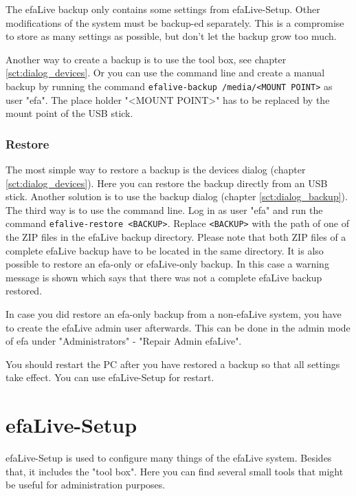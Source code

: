 \documentclass[a4paper,12pt,twoside]{article}
\begin{document}
The efaLive backup only contains some settings from efaLive-Setup. Other
modifications of the system must be backup-ed separately. This is a
compromise to store as many settings as possible, but
don't let the backup grow too much.

Another way to create a backup is to use the tool box, see chapter 
\ref{sct:dialog_devices}. Or you can use the command line and create a manual 
backup by running the command \texttt{efalive-backup 
/media/{\textless}MOUNT POINT{\textgreater}} as user "efa". The place 
holder "{\textless}MOUNT POINT{\textgreater}" has to be replaced by the 
mount point of the USB stick.


\subsubsection{Restore}
\label{sct:restore}
The most simple way to restore a backup is the devices dialog (chapter
\ref{sct:dialog_devices}). Here you can restore the backup directly from an USB stick.
Another solution is to use the backup dialog (chapter \ref{sct:dialog_backup}). The third
way is to use the command line. Log in as user
"efa" and run the command
\texttt{efalive-restore {\textless}BACKUP{\textgreater}}. Replace
\texttt{{\textless}BACKUP{\textgreater}} with the
path of one of the ZIP files in the efaLive backup directory. Please
note that both ZIP files of a complete efaLive backup have to be located in the
same directory. It is also possible to restore an efa-only or efaLive-only backup.
In this case a warning message is shown which says that there was not a complete
efaLive backup restored.

In case you did restore an efa-only backup from a non-efaLive system, you have
to create the efaLive admin user afterwards. This can be done in the admin mode
of efa under "Administrators" - "Repair Admin efaLive".

You should restart the PC after you have restored a backup so that all
settings take effect. You can use efaLive-Setup for restart.


\section{efaLive-Setup}
\label{sct:efalivesetup}
efaLive-Setup is used to configure
many things of the efaLive system. Besides that, it includes the
"tool box". Here you can find several small
tools that might be useful for administration purposes.
\end{document}

